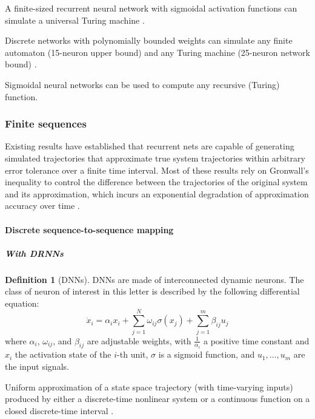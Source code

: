 \documentclass{article}
\theoremstyle{definition}
\newtheorem{definition}{Definition}
\theoremstyle{remark}
\begin{document}
A finite-sized recurrent neural network with sigmoidal activation functions can simulate a universal Turing machine \citep{siegelmann1992computational}.

Discrete networks with polynomially bounded weights can simulate any finite automaton (15-neuron upper bound) and any Turing machine (25-neuron network bound) \citep{indyk1995optimal}.

Sigmoidal neural networks can be used to compute any recursive (Turing) function\citep{kilian1996}.



\subsubsection{Finite sequences}
Existing results have established that recurrent nets are capable of generating simulated trajectories that approximate true system trajectories within arbitrary error tolerance over a finite time interval.
Most of these results rely on Gr\:onwall’s inequality to control the difference between the trajectories of the original system and its approximation, which incurs an exponential degradation of approximation accuracy over time
\citep{sontag1992neural, sontag1998learning, funahashi1993approximation,chow2000modeling, li2005approximation}.

\paragraph{Discrete sequence-to-sequence mapping} %

\subparagraph{With DRNNs}
\begin{definition}[DNNs]
DNNs are made of interconnected dynamic neurons. The class of neuron of interest in this letter is described by the following differential equation:
\[
\dot{x}_i = \alpha_i x_i + \sum_{j=1}^{N} \omega_{ij} \sigma(x_j) + \sum_{j=1}^{m} \beta_{ij} u_j \tag{1}
\]
where \( \alpha_i \), \( \omega_{ij} \), and \( \beta_{ij} \) are adjustable weights, with \( \frac{1}{\alpha_i} \) a positive time constant and \( x_i \) the activation state of the \( i \)-th unit, \( \sigma \) is a sigmoid function, and \( u_1, \dots, u_m \) are the input signals.
\end{definition}

Uniform approximation of a state space trajectory (with time-varying inputs) produced by either a discrete-time nonlinear system or a continuous function on a closed discrete-time interval \citep{jin1995universal}.
\end{document}
